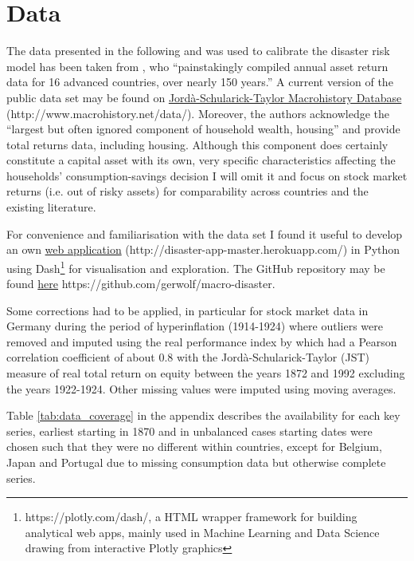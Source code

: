 \section{Data} \label{Data}
The data presented in the following and was used to calibrate the disaster risk model has been taken from \citet{Jorda2017}, who ``painstakingly compiled annual asset return data for 16 advanced countries, over nearly 150 years.'' A current version of the public data set may be found on \textcolor{blue}{\href{http://www.macrohistory.net/data/}{Jordà-Schularick-Taylor Macrohistory Database}} (http://www.macrohistory.net/data/). Moreover, the authors acknowledge the ``largest but often ignored component of household wealth, housing'' and provide total returns data, including housing. Although this component does certainly constitute a capital asset with its own, very specific characteristics affecting the households' consumption-savings decision I will omit it and focus on stock market returns (i.e. out of risky assets) for comparability across countries and the existing literature.

For convenience and familiarisation with the data set I found it useful to develop an own \textcolor{blue}{\href{http://disaster-app-master.herokuapp.com/}{web application}} (http://disaster-app-master.herokuapp.com/) in Python using Dash\footnote{https://plotly.com/dash/, a HTML wrapper framework for building analytical web apps, mainly used in Machine Learning and Data Science drawing from interactive Plotly graphics} for visualisation and exploration. The GitHub repository may be found \textcolor{blue}{\href{https://github.com/gerwolf/macro-disaster}{here}} https://github.com/gerwolf/macro-disaster.

Some corrections had to be applied, in particular for stock market data in Germany during the period of hyperinflation (1914-1924) where outliers were removed and imputed using the real performance index by \citet{Gielen1994} which had a Pearson correlation coefficient of about 0.8 with the Jordà-Schularick-Taylor (JST) measure of real total return on equity between the years 1872 and 1992 excluding the years 1922-1924. Other missing values were imputed using moving averages.

Table \ref{tab:data_coverage} in the appendix describes the availability for each key series, earliest starting in 1870 and in unbalanced cases starting dates were chosen such that they were no different within countries, except for Belgium, Japan and Portugal due to missing consumption data but otherwise complete series.


